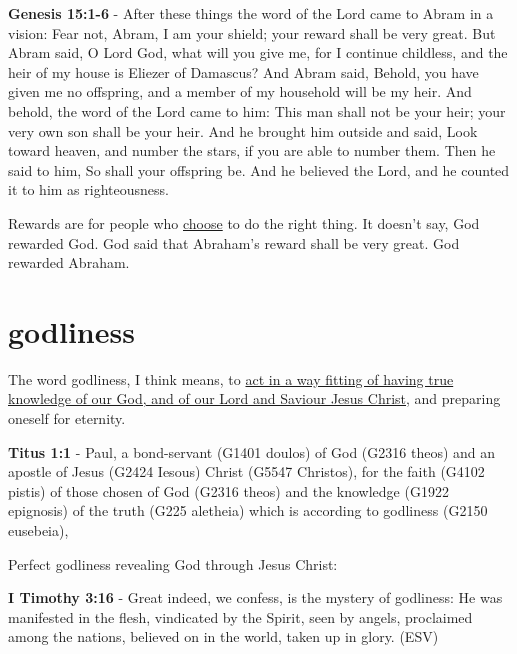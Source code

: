 \documentclass[11pt]{article}
\begin{document}
\textbf{Genesis 15:1-6} - After these things the word of the Lord came to Abram in a vision: Fear not, Abram, I am your shield; your reward shall be very great. But Abram said, O Lord God, what will you give me, for I continue childless, and the heir of my house is Eliezer of Damascus? And Abram said, Behold, you have given me no offspring, and a member of my household will be my heir. And behold, the word of the Lord came to him: This man shall not be your heir; your very own son shall be your heir. And he brought him outside and said, Look toward heaven, and number the stars, if you are able to number them. Then he said to him, So shall your offspring be. And he believed the Lord, and he counted it to him as righteousness.

Rewards are for people who \uline{choose} to do the right thing.
It doesn't say, God rewarded God. God said that Abraham's reward shall be very great. God rewarded Abraham.

\section{godliness}
\label{sec:org1236f8a}
The word godliness, I think means, to \uline{act in a way fitting of having true knowledge of our God, and of our Lord and Saviour Jesus Christ}, and preparing oneself for eternity.

\textbf{Titus 1:1} - Paul, a bond-servant (G1401 doulos) of God (G2316 theos) and an apostle of Jesus (G2424 Iesous) Christ (G5547 Christos), for the faith (G4102 pistis) of those chosen of God (G2316 theos) and the knowledge (G1922 epignosis) of the truth (G225 aletheia) which is according to godliness (G2150 eusebeia),

Perfect godliness revealing God through Jesus Christ:

\textbf{I Timothy 3:16} - Great indeed, we confess, is the mystery of godliness: He was manifested in the flesh, vindicated by the Spirit, seen by angels, proclaimed among the nations, believed on in the world, taken up in glory. (ESV)
\end{document}
